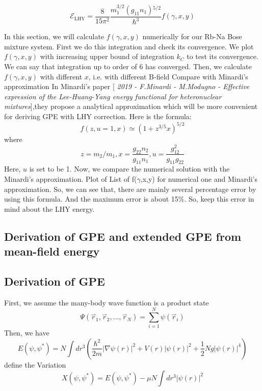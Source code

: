 \begin{equation}\mathcal{E}_{\text{LHY}}=\frac{8}{15\pi ^2}\frac{m_1^{3/2}\left(g_{11}n_1\right){}^{5/2}}{\hbar ^3}f(\gamma ,x,y)\end{equation}


In this section, we will calculate $f(\gamma ,x,y)$ numerically for our Rb-Na Bose mixture system.
First we do this integration and check its convergence. We plot $f(\gamma ,x,y)$ with increasing upper bound of integration $k_C$ to test its convergence.
We can say that integration up to order of 6 has converged. 
Then, we calculate $f(\gamma ,x,y)$ with different $x$, i.e. with different B-field
Compare with Minardi's approximation
In Minardi's paper [\textit{ 2019 - F.Minardi - M.Modugno - Effective expression of the Lee-Huang-Yang energy functional for heteronuclear mixtures}],they propose a analytical approximation which will be more convenient for deriving GPE with LHY correction. Here is the formula:
\begin{equation}
f(z,u=1,x)\simeq \left(1+z^{3/5}x\right)^{5/2}
\end{equation}
where
\begin{equation}
z=m_2/m_1, x=\frac{g_{22}n_2}{g_{11}n_1},u=\frac{g_{12}^2}{g_{11}g_{22}}
\end{equation}
Here, $u$ is set to be 1.
Now, we compare the numerical solution with the Minardi's approximation.
Plot of List of f($\gamma $,x,y) for numerical one and Minardi's approximation.
So, we can see that, there are mainly several percentage error by using this formula. And the maximum error is about 15$\%$. So, keep this error
in mind about the LHY energy.

\subsection{Derivation of GPE and extended GPE from mean-field energy}


\subsection{Derivation of GPE}

First, we assume the many-body wave function is a product state
\begin{equation}
\Psi \left(\overset{\rightharpoonup }{r}_1,\overset{\rightharpoonup }{r}_2,\ldots  ,\overset{\rightharpoonup }{r}_N\right)=\sum _{i=1}^N \psi \left(\overset{\rightharpoonup}{r}_i\right)
\end{equation}
Then, we have
\begin{equation}
E\left(\psi ,\psi ^*\right)=N\int dr^3\left(\frac{\hbar ^2}{2m}\left| \nabla \psi (r)\right| ^2+V(r)\left| \psi (r)\right| ^2+\frac{1}{2}N g\left|\psi (r)\right| ^4\right)
\end{equation}
define the Variation
\begin{equation}X\left(\psi ,\psi ^*\right)=E\left(\psi ,\psi ^*\right)-\mu  N\int dr^3\left| \psi (r)\right| ^2\end{equation}

